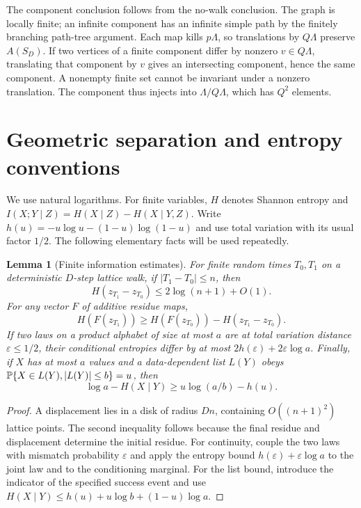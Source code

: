 \documentclass[11pt]{article}
\numberwithin{equation}{section}
\newtheorem{lemma}[theorem]{Lemma}
\theoremstyle{definition}\newtheorem{definition}[theorem]{Definition}
\theoremstyle{remark}\newtheorem{remark}[theorem]{Remark}
\newcommand{\abs}[1]{\lvert #1\rvert}
\begin{document}
The component conclusion follows from the no-walk conclusion. The graph is locally finite; an infinite component has an infinite simple path by the finitely branching path-tree argument. Each map kills $p\Lambda$, so translations by $Q\Lambda$ preserve $A(S_D)$. If two vertices of a finite component differ by nonzero $v\in Q\Lambda$, translating that component by $v$ gives an intersecting component, hence the same component. A nonempty finite set cannot be invariant under a nonzero translation. The component thus injects into $\Lambda/Q\Lambda$, which has $Q^2$ elements.

\section{Geometric separation and entropy conventions}\label{sec:geometry}

We use natural logarithms. For finite variables, $H$ denotes Shannon entropy and
$I(X;Y\mid Z)=H(X\mid Z)-H(X\mid Y,Z)$. Write
$h(u)=-u\log u-(1-u)\log(1-u)$ and use total variation with its usual factor $1/2$.
The following elementary facts will be used repeatedly.

\begin{lemma}[Finite information estimates]\label{lem:info}
For finite random times $T_0,T_1$ on a deterministic $D$-step lattice walk, if $\abs{T_1-T_0}\le n$, then
\[
 H(z_{T_1}-z_{T_0})\le2\log(n+1)+O(1).
\]
For any vector $F$ of additive residue maps,
\[
 H(F(z_{T_1}))\ge H(F(z_{T_0}))-H(z_{T_1}-z_{T_0}).
\]
If two laws on a product alphabet of size at most $a$ are at total variation distance $\varepsilon\le1/2$, their conditional entropies differ by at most $2h(\varepsilon)+2\varepsilon\log a$.
Finally, if $X$ has at most $a$ values and a data-dependent list $L(Y)$ obeys
$\Prob\{X\in L(Y),\abs{L(Y)}\le b\}=u$, then
\[
 \log a-H(X\mid Y)\ge u\log(a/b)-h(u).
\]
\end{lemma}
\begin{proof}
A displacement lies in a disk of radius $Dn$, containing $O((n+1)^2)$ lattice points. The second inequality follows because the final residue and displacement determine the initial residue. For continuity, couple the two laws with mismatch probability $\varepsilon$ and apply the entropy bound $h(\varepsilon)+\varepsilon\log a$ to the joint law and to the conditioning marginal. For the list bound, introduce the indicator of the specified success event and use
$H(X\mid Y)\le h(u)+u\log b+(1-u)\log a$.
\end{proof}
\end{document}
